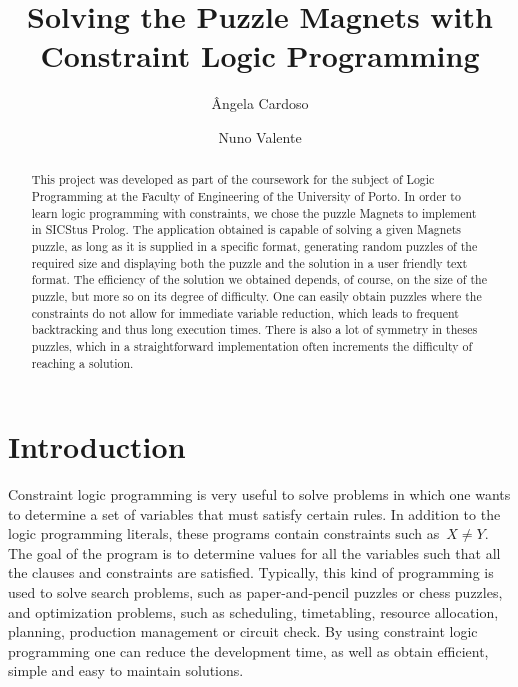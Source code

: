 \documentclass{llncs}
\begin{document}
\title{Solving the Puzzle Magnets with Constraint Logic Programming}
\author{\^Angela Cardoso \and Nuno Valente}
\maketitle


\begin{abstract}
	
	This project was developed as part of the coursework for the subject of Logic Programming at the Faculty of Engineering of the University of Porto. In order to learn logic programming with constraints, we chose the puzzle Magnets to implement in SICStus Prolog. The application obtained is capable of solving a given Magnets puzzle, as long as it is supplied in a specific format, generating random puzzles of the required size and displaying both the puzzle and the solution in a user friendly text format. The efficiency of the solution we obtained depends, of course, on the size of the puzzle, but more so on its degree of difficulty. One can easily obtain puzzles where the constraints do not allow for immediate variable reduction, which leads to frequent backtracking and thus long execution times. There is also a lot of symmetry in theses puzzles, which in a straightforward implementation often increments the difficulty of reaching a solution. 
	
\end{abstract}


\section{Introduction}

Constraint logic programming is very useful to solve problems in which one wants to determine a set of variables that must satisfy certain rules. In addition to the logic programming literals, these programs contain constraints such as~$X \neq Y$. The goal of the program is to determine values for all the variables such that all the clauses and constraints are satisfied. Typically, this kind of programming is used to solve search problems, such as paper-and-pencil puzzles or chess puzzles, and optimization problems, such as scheduling, timetabling, resource allocation, planning, production management or circuit check. By using constraint logic programming one can reduce the development time, as well as obtain efficient, simple and easy to maintain solutions.
\end{document}
